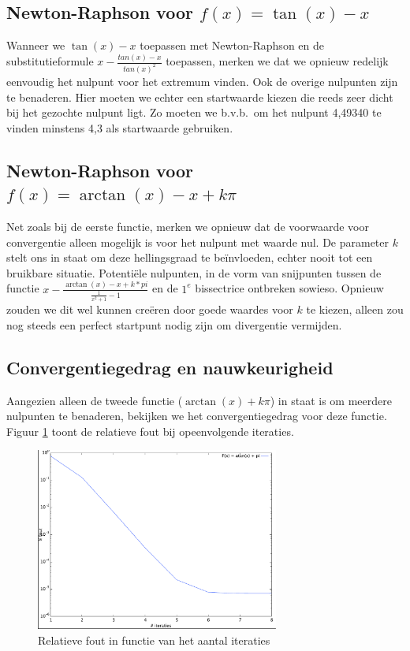 \documentclass[12pt,a4paper]{article}
\begin{document}
\subsection{Newton-Raphson voor $f(x) = \tan(x) - x$}

Wanneer we $\tan(x) - x$ toepassen met Newton-Raphson en de substitutieformule $x - \frac{tan(x) - x}{tan(x)^2}$ toepassen, merken we dat we opnieuw redelijk eenvoudig het nulpunt voor het extremum vinden. Ook de overige nulpunten zijn te benaderen. Hier moeten we echter een startwaarde kiezen die reeds zeer dicht bij het gezochte nulpunt ligt. Zo moeten we b.v.b.\ om het nulpunt 4,49340 te vinden minstens 4,3 als startwaarde gebruiken.

\subsection{Newton-Raphson voor $f(x) = \arctan(x) - x + k\pi$}

Net zoals bij de eerste functie, merken we opnieuw dat de voorwaarde voor convergentie alleen mogelijk is voor het nulpunt met waarde nul. De parameter $k$ stelt ons in staat om deze hellingsgraad te be\"invloeden, echter nooit tot een bruikbare situatie. Potenti\"ele nulpunten, in de vorm van snijpunten tussen de functie $x - \frac{\arctan(x) - x + k*pi}{\frac{1}{x^2+1} - 1}$ en de $1^e$ bissectrice ontbreken sowieso. Opnieuw zouden we dit wel kunnen cre\"eren door goede waardes voor $k$ te kiezen, alleen zou nog steeds een perfect startpunt nodig zijn om divergentie vermijden.

\subsection{Convergentiegedrag en nauwkeurigheid}

Aangezien alleen de tweede functie ($\arctan(x) + k\pi$) in staat is om meerdere nulpunten te benaderen, bekijken we het convergentiegedrag voor deze functie. Figuur \ref{fig:convergentie-error} toont de relatieve fout bij opeenvolgende iteraties.

\begin{figure}
\begin{center}
 \includegraphics[width=80mm]{resources/convergentie-error.pdf}
 \caption{Relatieve fout in functie van het aantal iteraties}
  \label{fig:convergentie-error}
\end{center}
\end{figure}
\end{document}

